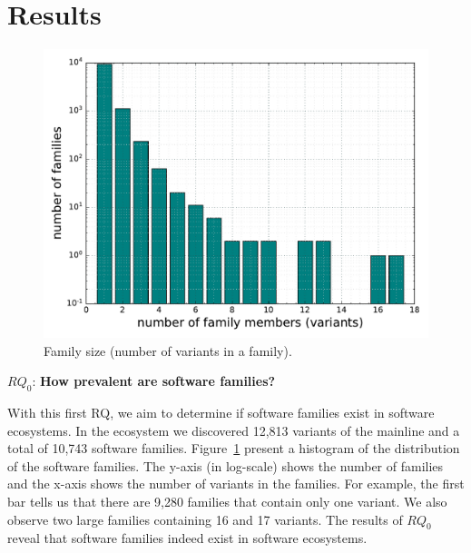 \section{Results}
\label{sec:results}
\begin{figure}[htbp]
\vspace{-.3cm}
   \centering
    \includegraphics[scale=0.4]{figures/variants.pdf}
    \caption{Family size (number of variants in a family).}
    \label{fig:variants}
\end{figure}

\noindent
$RQ_0$: \textbf{How prevalent are software families?}

With this first RQ, we aim to determine if software families exist in software ecosystems. In the \js ecosystem we discovered 12,813 variants of the mainline and a total of 10,743 software families. Figure~\ref{fig:variants} present a histogram of the distribution of the software families. The y-axis (in log-scale) shows the number of families and  the x-axis shows the number of variants in the families. For example, the first bar tells us that there are 9,280 families that contain only one variant. We also observe two large families containing 16 and 17 variants. The results of $RQ_0$ reveal that software families indeed exist in software ecosystems.

